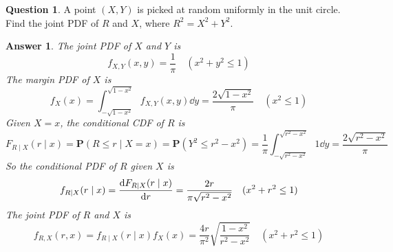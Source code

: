 \documentclass[utf8]{article}
\theoremstyle{definition}%
\newtheorem{question}{Question} %
\theoremstyle{plain}%
\newtheorem{answer}{Answer} %
\begin{document}
\begin{question}
    A point $(X, Y)$ is picked at random uniformly in the unit circle. Find the joint PDF of $R$ and $X$, where $R^2 = X^2 + Y^2$.
\end{question}
\begin{answer}
    The joint PDF of $X$ and $Y$ is
    \begin{equation}
        f_{X, Y}(x, y) = \frac{1}{\pi} \quad (x^2 + y^2 \leq 1)
    \end{equation}
    The margin PDF of $X$ is
    \begin{equation}
        f_{X}(x) = \int_{-\sqrt{1 - x^2}}^{\sqrt{1 - x^2}} f_{X, Y}(x, y) \dd{y} = \frac{2\sqrt{1 - x^2}}{\pi} \quad (x^2 \leq 1)
    \end{equation}
    Given $X = x$, the conditional CDF of $R$ is 
    \begin{equation}
        F_{R \mid X}(r \mid x) = \mathbf{P}(R \leq r \mid X = x) = \mathbf{P}(Y^2 \leq r^2 - x^2) = \frac{1}{\pi} \int_{-\sqrt{r^2 - x^2}}^{\sqrt{r^2 - x^2}} 1 \dd{y} = \frac{2\sqrt{r^2 - x^2}}{\pi}
    \end{equation}
    So the conditional PDF of $R$ given $X$ is
    \begin{equation}
        f_{R \mid X}(r \mid x) = \dv{F_{R \mid X}(r \mid x)}{r} = \frac{2r}{\pi\sqrt{r^2 - x^2}} \quad (x^2 + r^2 \leq 1)
    \end{equation}
    The joint PDF of $R$ and $X$ is
    \begin{equation}
        f_{R, X}(r, x) = f_{R \mid X}(r \mid x) f_{X}(x) = \frac{4r}{\pi^2} \sqrt{\frac{1 - x^2}{r^2 - x^2}} \quad (x^2 + r^2 \leq 1)
    \end{equation}
\end{answer}
\end{document}
